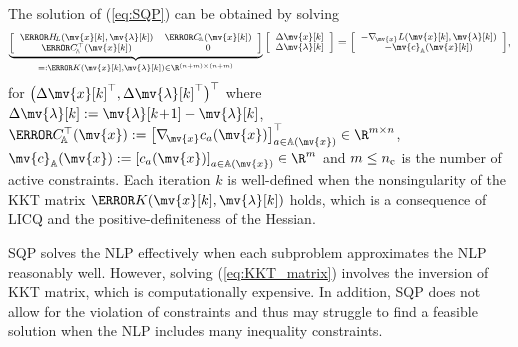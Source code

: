 \documentclass[journal]{IEEEtranTIE}
\begin{document}
The solution of (\ref{eq:SQP}) can be obtained by solving 
%
\begin{align}\label{eq:KKT_matrix}
{\scriptsize
\underbrace{\left[ \begin{array}{*{20}{c}}
\mm{H}_{\!L}(\mv{x}[k],\mv{\lambda}[k])& \mm{C}_{\!\mathbb{A}}(\mv{x}[k])\\
\mm{C}^\top_{\!\mathbb{A}}(\mv{x}[k])&0
\end{array} \right]}_{=:\mm{K}(\mv{x}[k],\mv{\lambda}[k]) \in \R^{(n+m) \times (n+m)}}\left[ \begin{array}{*{20}{c}}
\Delta\mv{x}[k]\\
\Delta\mv{\lambda}[k]
\end{array} \right] = \left[ \begin{array}{*{20}{c}}
 - \nabla_{\!\mv{x}}L(\mv{x}[k],\mv{\lambda}[k])\\
 - \mv{c}_{\mathbb{A}}(\mv{x}[k])
\end{array} \right]},
\end{align}
for $\big(\Delta\mv{x}[k]^\top, \Delta\mv{\lambda}[k]^\top\big)^\top$ where $\Delta\mv{\lambda}[k] := \mv{\lambda}[k\!+\!1] - \mv{\lambda}[k]$,  $\mm{C}_{\!\mathbb{A}}^\top(\mv{x}) := \left[ {\nabla_{\!\mv{x}} {c_a}(\mv{x})} \right]^\top_ {a \in \mathbb{A}(\mv{x})} \in \R^{m \times n}$, $\mv{c}_{\mathbb{A}}(\mv{x}) := {\left[ {{c_a}(\mv{x})} \right]_{a \in \mathbb{A}(\mv{x})}} \in\R^m$ and  $m \leq n_{\rm c}$ is the number of active constraints. Each iteration $k$ is well-defined when the nonsingularity of the KKT matrix $\mm{K}(\mv{x}[k],\mv{\lambda}[k])$ holds, which is a consequence of LICQ and the positive-definiteness of the Hessian.

SQP solves the NLP effectively when each subproblem approximates the NLP reasonably well. However, solving (\ref{eq:KKT_matrix}) involves the inversion of KKT matrix, which is computationally expensive. In addition, SQP does not allow for the violation of constraints and thus may struggle to find a feasible solution when the NLP includes many inequality constraints.
\end{document}
